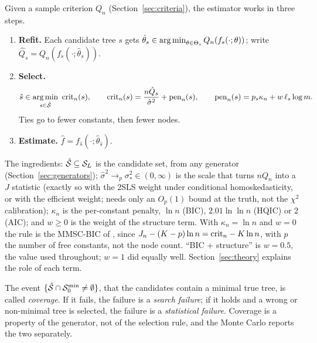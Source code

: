 Given a sample criterion $Q_n$ (Section~\ref{sec:criteria}), the estimator works in three steps.
\begin{enumerate}
\item \textbf{Refit.} Each candidate tree $s$ gets $\hat\theta_s \in \operatorname*{arg\,min}_{\theta \in \Theta_s}Q_n(f_s(\cdot;\theta))$; write $\hat Q_s = Q_n(f_s(\cdot;\hat\theta_s))$.
\item \textbf{Select.}
\begin{equation}
\hat s \in \operatorname*{arg\,min}_{s \in \hat{\mathcal{S}}}\ \mathrm{crit}_n(s), \qquad \mathrm{crit}_n(s) = \frac{n\hat Q_s}{\hat\sigma^2} + \mathrm{pen}_n(s), \qquad \mathrm{pen}_n(s) = p_s\kappa_n + w\,\ell_s\log m.
\label{eq:crit}
\end{equation}
Ties go to fewer constants, then fewer nodes.
\item \textbf{Estimate.} $\hat f = f_{\hat s}(\cdot;\hat\theta_{\hat s})$.
\end{enumerate}
The ingredients: $\hat{\mathcal{S}} \subseteq \mathcal{S}_L$ is the candidate set, from any generator (Section~\ref{sec:generators}); $\hat\sigma^2 \to_p \sigma_*^2 \in (0, \infty)$ is the scale that turns $nQ_n$ into a $J$ statistic (exactly so with the 2SLS weight under conditional homoskedasticity, or with the efficient weight;  needs only an $O_p(1)$ bound at the truth, not the $\chi^2$ calibration); $\kappa_n$ is the per-constant penalty, $\ln n$ (BIC), $2.01\ln\ln n$ (HQIC) or $2$ (AIC); and $w \ge 0$ is the weight of the structure term. With $\kappa_n = \ln n$ and $w = 0$ the rule is the MMSC-BIC of \citet{andrewslu2001}, since $J_n - (K - p)\ln n = \mathrm{crit}_n - K\ln n$, with $p$ the number of free constants, not the node count. ``BIC + structure'' is $w = 0.5$, the value used throughout; $w = 1$ did equally well. Section~\ref{sec:theory} explains the role of each term.

The event $\{\hat{\mathcal{S}} \cap \mathcal{S}_0^{\min} \ne \emptyset\}$, that the candidates contain a minimal true tree, is called \emph{coverage}. If it fails, the failure is a \emph{search failure}; if it holds and a wrong or non-minimal tree is selected, the failure is a \emph{statistical failure}. Coverage is a property of the generator, not of the selection rule, and the Monte Carlo reports the two separately.
